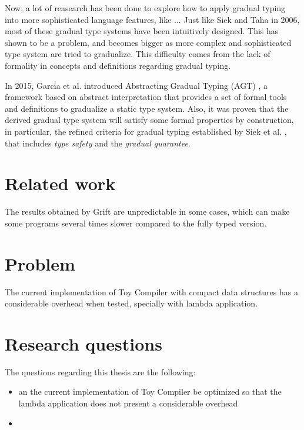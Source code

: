 \documentclass[submission]{eptcs}
\begin{document}
Now, a lot of reasearch has been done to explore how to apply gradual typing into more sophisticated language features, like ...
Just like Siek and Taha in 2006, most of these gradual type systems have been intuitively designed.
This has shown to be a problem, and becomes bigger as more complex and sophisticated type system are tried to gradualize. 
This difficulty comes from the lack of formality in concepts and definitions regarding gradual typing.


In 2015, Garcia et al. introduced Abstracting Gradual Typing (AGT) \cite{10.1145/2914770.2837670}, a framework based on abstract interpretation that provides a set of formal tools and definitions to gradualize a static type system.
Also, it was proven that the derived gradual type system will satisfy some formal properties by construction, in particular, 
the refined criteria for gradual typing established by Siek et al. \cite{siek_et_al:LIPIcs.SNAPL.2015.274}, that includes \textit{type safety} and the \textit{gradual guarantee}.


\section{Related work}

The results obtained by Grift \cite{grift} are unpredictable in some cases, which can make some programs several times slower compared to the fully typed version.

\section{Problem}

The current implementation of Toy Compiler with compact data structures has a considerable overhead when tested, specially with lambda application.

\section{Research questions}

The questions regarding this thesis are the following:
\begin{itemize}
  \item an the current implementation of Toy Compiler be optimized so that the lambda application does not present a considerable overhead
  \item 
\end{itemize}
\end{document}
